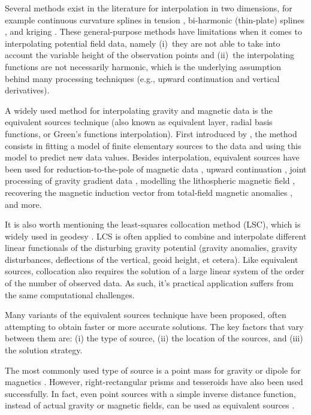 Several methods exist in the literature for interpolation in two dimensions,
for example continuous curvature splines in tension \citep{smith1990},
bi-harmonic (thin-plate) splines \citep{sandwell1987}, and kriging
\citep{hansen1993}.
These general-purpose methods have limitations when it comes to interpolating
potential field data, namely
(i)~they are not able to take into account the variable height of the
observation points and
(ii)~the interpolating functions are not necessarily harmonic, which
is the underlying assumption behind many processing techniques
(e.g., upward continuation and vertical derivatives).

A widely used method for interpolating gravity and magnetic data
is the equivalent sources technique (also known as equivalent layer, radial
basis functions, or Green's functions interpolation).
First introduced by \citet{dampney1969}, the method consists in fitting a model
of finite elementary sources to the data and using this model to predict new
data values.
Besides interpolation, equivalent sources have been used for
reduction-to-the-pole of magnetic data
\citep{silva1986, nakatsuka2006, guspi2009}, upward
continuation \citep{emilia1973, li2010}, joint processing of gravity gradient
data \citep{barnes2011}, modelling the lithospheric magnetic field
\citep{kother2015}, recovering the magnetic induction vector from
total-field magnetic anomalies \citep{li2020}, and more.

It is also worth mentioning the least-squares collocation method
(LSC), which is widely used in geodesy
\citep[][and references therein]{tscherning2015}.
LCS is often applied to combine and interpolate different linear functionals of
the disturbing gravity potential (gravity anomalies, gravity disturbances,
deflections of the vertical, geoid height, et cetera).
Like equivalent sources, collocation also requires the solution of a large
linear system of the order of the number of observed data.
As such, it's practical application suffers from the same computational
challenges.

Many variants of the equivalent sources technique have been proposed, often
attempting to obtain faster or more accurate solutions.
The key factors that vary between them are: (i) the type of source, (ii)
the location of the sources, and (iii) the solution strategy.

The most commonly used type of source is a point mass for gravity or dipole for
magnetics \citep[e.g.,~][]{vonfrese1981, silva1986, mendonca1994,
siqueira2017}.
However, right-rectangular prisms \citep[e.g.,][]{barnes2011, jirigalatu2019,
li2020} and tesseroids \citep{bouman2016} have also been used successfully.
In fact, even point sources with a simple inverse distance function, instead of
actual gravity or magnetic fields, can be used as
equivalent sources \citep{cordell1992}.


